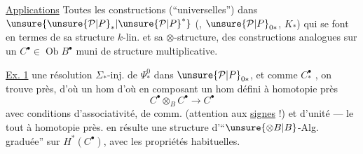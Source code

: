 \uline{Applications} Toutes les constructions (``universelles'') dans $\unsure{\unsure{\mathcal P|P}_*|\unsure{\mathcal P|P}^*}$  (, $\unsure{\mathcal P|P}_{0*}$, $K_*$) qui se font  en termes de sa structure $k$-lin. et sa $\otimes$-structure,   des constructions analogues sur un $C^\bullet\in\operatorname{Ob}B^\bullet$ muni de structure multiplicative.

\uline{Ex. 1}   une résolution $\Sigma_*$-inj. de $\Psi_*^0$ dans $\unsure{\mathcal P|P}_{0*}$, et comme $C_*^\bullet$ , on trouve
près, d'où un hom
d'où en composant un hom défini à homotopie près
\[
C^\bullet\otimes_B C^\bullet\longrightarrow C^\bullet
\]
avec conditions d'associativité, de comm. (attention aux \uline{signes} !) et d'unité --- le tout à homotopie près.  en résulte une structure d'``$\unsure{\otimes B|B}$-Alg. graduée'' sur $H^*(C^\bullet)$, avec les propriétés habituelles.

